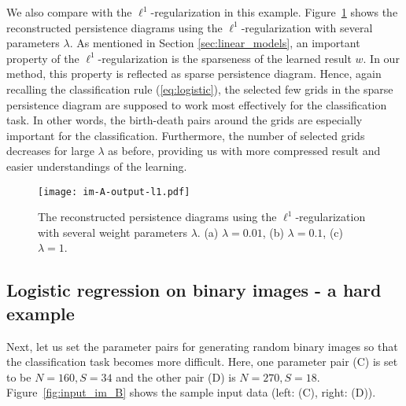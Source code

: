 \documentclass[smallextended]{svjour3}
\begin{document}
We also compare with the $\ell^1$-regularization in this example. 
Figure~\ref{fig:output_im_A_l1} shows the reconstructed persistence diagrams  using the $\ell^1$-regularization with several parameters $\lambda$.
As mentioned in Section \ref{sec:linear_models}, an important property of the $\ell^1$-regularization is the sparseness of the learned result $w$. In our method, this property is reflected as sparse persistence diagram. Hence, again recalling the classification rule (\ref{eq:logistic}), the selected few grids in the sparse persistence diagram are supposed to work most effectively for the classification task. In other words, the birth-death pairs around the grids are especially important for the classification.
Furthermore, the number of selected grids decreases for large $\lambda$ as before, providing us with more compressed result and easier understandings of the learning. 


\begin{figure}[htbp]
  \centering
  \texttt{[image: im-A-output-l1.pdf]}
  \caption{The reconstructed persistence diagrams using the $\ell^1$-regularization with several weight parameters $\lambda$.
  (a) $\lambda=0.01$, (b) $\lambda = 0.1$, (c) $\lambda = 1$.}
  \label{fig:output_im_A_l1}
\end{figure}







\subsection{Logistic regression on binary images - a hard example}
\label{sec:logreg_im_difficult}
Next, let us set the parameter pairs for generating random binary images so that the classification task becomes more difficult. Here, one parameter pair (C) is set to be $N=160, S=34$ and the other pair (D) is $N=270, S=18$. Figure~\ref{fig:input_im_B} shows the sample input data (left: (C), right: (D)).
\end{document}
